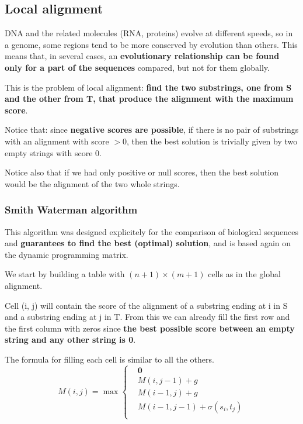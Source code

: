 \documentclass[../main.tex]{subfiles}
\begin{document}
\subsection{Local alignment}

DNA and the related molecules (RNA, proteins) evolve at different speeds, so in a genome, some regions tend to be more conserved by evolution than others. This means that, in several cases, an \textbf{evolutionary relationship can be found only for a part of the sequences} compared, but not for them globally.

This is the problem of local alignment: \textbf{find the two substrings, one from S and the other from T, that produce the alignment with the maximum score}.

Notice that: since \textbf{negative scores are possible}, if there is no pair of substrings with an alignment with score $> 0$, then the best solution is trivially given by two empty strings with score 0.

Notice also that if we had only positive or null scores, then the best solution would be the alignment of the two whole strings.

\subsubsection{Smith Waterman algorithm}

This algorithm was designed explicitely for the comparison of biological sequences and \textbf{guarantees to find the best (optimal) solution}, and is based again on the dynamic programming matrix.

We start by building a table with $(n+1)\times(m+1)$ cells as in the global alignment.

Cell (i, j) will contain the score of the alignment of a substring ending at i in S and a substring ending at j in T. From this we can already fill the first row and the first column with zeros since \textbf{the best possible score between an empty string and any other string is 0}.

The formula for filling each cell is similar to all the others.
$$
	M(i, j) = \max \left\{\begin{array}{rcl}
		 & \mathbf{0}                     \\
		 & M(i, j-1) + g                  \\
		 & M(i-1, j) + g                  \\
		 & M(i-1, j-1) + \sigma(s_i, t_j) \\
	\end{array}
	\right.
$$
\end{document}
